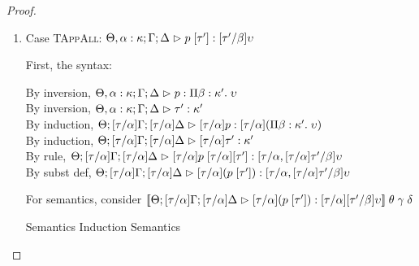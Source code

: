 \begin{proof}
\begin{enumerate}
\item Case \textsc{TAppAll}: $\judgeA[\Theta, \alpha:\kappa; \Gamma; \Delta]{p\;[\tau']}{[\tau'/\beta]\upsilon}$
  
  First, the syntax:
  \begin{tabbedproof}
    \oo By inversion, $\judgeA[\Theta, \alpha:\kappa; \Gamma; \Delta]{p}{\forallsort{\beta}{\kappa'}{\upsilon}}$\\
    \oo By inversion, $\judgeA[\Theta, \alpha:\kappa; \Gamma; \Delta]{\tau'}{\kappa'}$\\
    \oo By induction, $\judgeA[\Theta; {[\tau/\alpha]}\Gamma; {[\tau/\alpha]}\Delta]{{[\tau/\alpha]}p}{{[\tau/\alpha]}(\forallsort{\beta}{\kappa'}{\upsilon})}$\\
    \oo By induction, $\judgeA[\Theta; {[\tau/\alpha]}\Gamma; {[\tau/\alpha]}\Delta]{{[\tau/\alpha]}\tau'}{\kappa'}$\\
    \oo By rule, $\judgeA[\Theta; {[\tau/\alpha]}\Gamma; {[\tau/\alpha]}\Delta]{{[\tau/\alpha]}p\;{[\tau/\alpha]}[\tau']}{{[\tau/\alpha, [\tau/\alpha]\tau'/\beta]}\upsilon}$\\
    \oo By subst def, $\judgeA[\Theta; {[\tau/\alpha]}\Gamma; {[\tau/\alpha]}\Delta]{{[\tau/\alpha]}(p\;[\tau'])}{{[\tau/\alpha, [\tau/\alpha]\tau'/\beta]}\upsilon}$\\
  \end{tabbedproof}

  For semantics, consider $\interp{\judgeA[\Theta;  
                                           {[\tau/\alpha]}\Gamma; 
                                           {[\tau/\alpha]}\Delta]
                                          {{[\tau/\alpha]}(p\;[\tau'])}
                                          {{[\tau/\alpha]}[\tau'/\beta]\upsilon}}\;\theta\;\gamma\;\delta$
  \begin{eqnproof}
    {Semantics}
    {Induction}
          {Semantics}
  \end{eqnproof}



\end{enumerate}
\end{proof}

